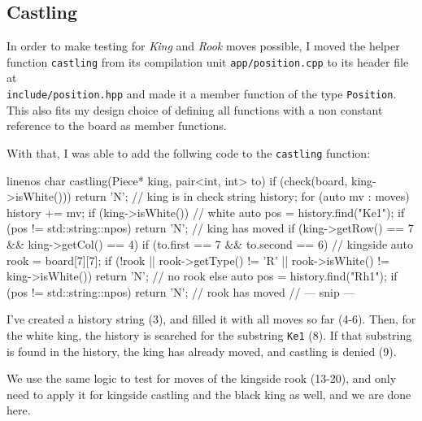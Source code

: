\subsection{Castling}

In order to make testing for \emph{King} and \emph{Rook} moves possible,
I moved the helper function \texttt{castling} from its compilation unit \texttt{app/position.cpp}
to its header file at\\
\texttt{include/position.hpp} and made it a member function of the type \texttt{Position}.\\
This also fits my design choice of defining all functions with a non constant reference to the
board as member functions.

With that, I was able to add the follwing code to the \texttt{castling} function:

\begin{cpp*}{linenos}
char castling(Piece* king, pair<int, int> to) {
  if (check(board, king->isWhite())) return 'N'; // king is in check
  string history;
  for (auto mv : moves) {
    history += mv;
  }
  if (king->isWhite()) { // white
    auto pos = history.find("Ke1");
    if (pos != std::string::npos) return 'N'; // king has moved
    if (king->getRow() == 7 && king->getCol() == 4) {
      if (to.first == 7 && to.second == 6) { // kingside
        auto rook = board[7][7];
        if (!rook || rook->getType() != 'R'
                  || rook->isWhite() != king->isWhite())
        {
          return 'N'; // no rook
        } else {
          auto pos = history.find("Rh1");
          if (pos != std::string::npos) return 'N'; // rook has moved
        }
        // --- snip ---
      }
    }
  }
}
\end{cpp*}

I've created a history string (3), and filled it with all moves so far (4-6).
Then, for the white king, the history is searched for the substring \texttt{Ke1} (8).
If that substring is found in the history, the king has already moved, and castling is denied (9).

We use the same logic to test for moves of the kingside rook (13-20), and only need to apply it
for kingside castling and the black king as well, and we are done here.
